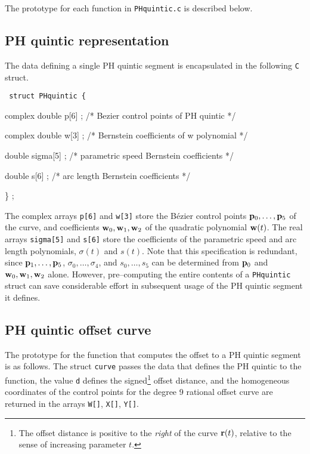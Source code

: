 \documentclass[12pt]{article}
\def\p{{\bf p}}
\def\r{{\bf r}}
\def\w{{\bf w}}
\begin{document}
The prototype for each function in {\tt PHquintic.c} is described below.

\subsection{PH quintic representation}

The data defining a single PH quintic segment is encapsulated in the 
following {\tt C} struct.

\medskip

{\tt
\smallskip\noindent
struct PHquintic \{ 

\smallskip\noindent
complex double p[6] ; /* Bezier control points of PH quintic */

\smallskip\noindent
complex double w[3] ; /* Bernstein coefficients of w polynomial */ 

\smallskip\noindent
double sigma[5] ; /* parametric speed Bernstein coefficients */ 

\smallskip\noindent
double s[6] ; /* arc length Bernstein coefficients */ 

\smallskip\noindent
\} ; 
}

\bigskip\noindent
The complex arrays {\tt p[6]} and {\tt w[3]} store the B\'ezier control 
points $\p_0,\ldots,\p_5$ of the curve, and coefficients $\w_0,\w_1,\w_2$ 
of the quadratic polynomial $\w(t)$. The real arrays {\tt sigma[5]} and 
{\tt s[6]} store the coefficients of the parametric speed and arc length 
polynomials, $\sigma(t)$ and $s(t)$. Note that this specification is 
redundant, since $\p_1,\ldots,\p_5$, $\sigma_0,\ldots,\sigma_4$, and 
$s_0,\ldots,s_5$ can be determined from $\p_0$ and $\w_0,\w_1,\w_2$ alone. 
However, pre--computing the entire contents of a {\tt PHquintic} struct 
can save considerable effort in subsequent usage of the PH quintic segment 
it defines.

\subsection{PH quintic offset curve}

The prototype for the function that computes the offset to a PH quintic 
segment is as follows. The struct {\tt curve} passes the data that 
defines the PH quintic to the function, the value {\tt d} defines the 
signed\footnote{The offset distance is positive to the {\it right\/} 
of the curve $\r(t)$, relative to the sense of increasing parameter $t$.}
offset distance, and the homogeneous coordinates of the control points 
for the degree 9 rational offset curve are returned in the arrays 
{\tt W[]}, {\tt X[]}, {\tt Y[]}.
\end{document}

